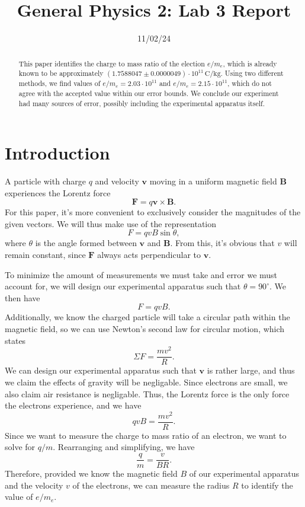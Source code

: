 \documentclass[11pt, letterpaper]{report}
\title{General Physics 2: Lab 3 Report}
\date{11/02/24}
\begin{document}
\maketitle
\begin{abstract}
	This paper identifies the charge to mass ratio of the election $e /m_e$, which is already known to be approximately $(1.7588047\pm 0.0000049)\cdot 10^{11}\,\text{C}/\text{kg}$. Using two different methods, we find values of $e /m_e = 2.03\cdot 10^{11}$ and $e /m_e = 2.15\cdot 10^{11}$, which do not agree with the accepted value within our error bounds. We conclude our experiment had many sources of error, possibly including the experimental apparatus itself.
\end{abstract}
\section{Introduction}
A particle with charge $q$ and velocity $\mathbf{v}$ moving in a uniform magnetic field $\mathbf{B}$ experiences the Lorentz force
\begin{equation}\label{eq:1}
	\mathbf{F}=q \mathbf{v}\times \mathbf{B}
.\end{equation}
For this paper, it's more convenient to exclusively consider the magnitudes of the given vectors. We will thus make use of the representation
\begin{equation}\label{eq:2}
	F=qvB\sin \theta 
,\end{equation}
where $\theta $ is the angle formed between $\mathbf{v}$ and $\mathbf{B}$. From this, it's obvious that $v$ will remain constant, since $\mathbf{F}$ always acts perpendicular to $\mathbf{v}$.

To minimize the amount of measurements we must take and error we must account for, we will design our experimental apparatus such that $\theta =90^\circ $. We then have
\begin{equation}\label{eq:3}
	F=qvB
.\end{equation}
Additionally, we know the charged particle will take a circular path within the magnetic field, so we can use Newton's second law for circular motion, which states
\begin{equation}\label{eq:4}
	\Sigma F=\frac{mv^2}{R}
.\end{equation}
We can design our experimental apparatus such that $\mathbf{v}$ is rather large, and thus we claim the effects of gravity will be negligable. Since electrons are small, we also claim air resistance is negligable. Thus, the Lorentz force is the only force the electrons experience, and we have
\begin{equation}\label{eq:5}
	qvB=\frac{mv^2}{R}
.\end{equation}
Since we want to measure the charge to mass ratio of an electron, we want to solve for $q / m$. Rearranging and simplifying, we have
\begin{equation}\label{eq:6}
	\frac{q}{m}=\frac{v}{BR}
.\end{equation}
Therefore, provided we know the magnetic field $B$ of our experimental apparatus and the velocity $v$ of the electrons, we can measure the radius $R$ to identify the value of $e /m_e$.
\end{document}
